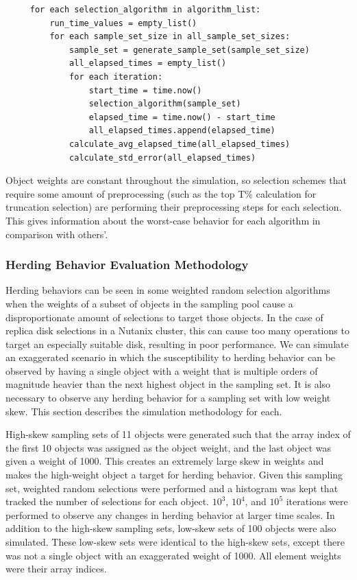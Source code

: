 \documentclass[12pt]{article}
\begin{document}
     \singlespace
     \begin{tcolorbox}
     \begin{verbatim}
     for each selection_algorithm in algorithm_list:
         run_time_values = empty_list()
         for each sample_set_size in all_sample_set_sizes:
             sample_set = generate_sample_set(sample_set_size)
             all_elapsed_times = empty_list()
             for each iteration:
                 start_time = time.now()
                 selection_algorithm(sample_set)
                 elapsed_time = time.now() - start_time
                 all_elapsed_times.append(elapsed_time)
             calculate_avg_elapsed_time(all_elapsed_times)
             calculate_std_error(all_elapsed_times)
     \end{verbatim}
     \end{tcolorbox}
     \doublespace
        
    Object weights are constant throughout the simulation, so selection schemes
    that require some amount of preprocessing (such as the top T\% calculation
    for truncation selection) are performing their preprocessing steps for each
    selection. This gives information about the worst-case behavior for each
    algorithm in comparison with others'.

    \subsubsection{Herding Behavior Evaluation Methodology}
    Herding behaviors can be seen in some weighted random selection
    algorithms when the weights of a subset of objects in the sampling pool
    cause a disproportionate amount of selections to target those objects. In
    the case of replica disk selections in a Nutanix cluster, this can cause
    too many operations to target an especially suitable disk, resulting in
    poor performance. We can simulate an exaggerated scenario in which the
    susceptibility to herding behavior can be observed by having a single
    object with a weight that is multiple orders of magnitude heavier than the
    next highest object in the sampling set. It is also necessary to observe
    any herding behavior for a sampling set with low weight skew. This section
    describes the simulation methodology for each.

    High-skew sampling sets of 11 objects were generated such that the array
    index of the first 10 objects was assigned as the object weight, and the
    last object was given a weight of 1000. This creates an extremely large
    skew in weights and makes the high-weight object a target for herding
    behavior. Given this sampling set, weighted random selections were
    performed and a histogram was kept that tracked the number of selections
    for each object. $10^3$, $10^4$, and $10^5$ iterations were performed to observe any
    changes in herding behavior at larger time scales. In addition to the
    high-skew sampling sets, low-skew sets of 100 objects were also simulated.
    These low-skew sets were identical to the high-skew sets, except there was
    not a single object with an exaggerated weight of 1000. All element weights
    were their array indices.
\end{document}
